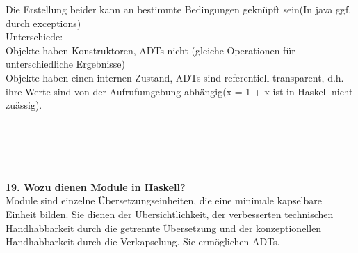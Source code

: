 \documentclass{article}
\begin{document}
Die Erstellung beider kann an bestimmte Bedingungen gekn\"upft sein(In java ggf. durch exceptions)
\\
Unterschiede:\\
Objekte haben Konstruktoren, ADTs nicht (gleiche Operationen für unterschiedliche Ergebnisse)\\
Objekte haben einen internen Zustand, ADTs sind 
referentiell transparent, d.h. ihre Werte sind von der Aufrufumgebung abhängig(x = 1 + x ist in Haskell nicht zu\"assig).\\
\\
\\
\\
\\
\\
\textbf{19. Wozu dienen Module in Haskell?}
\\
Module sind einzelne Übersetzungseinheiten, die eine minimale kapselbare Einheit bilden. Sie dienen der Übersichtlichkeit, der verbesserten technischen Handhabbarkeit durch die getrennte Übersetzung und der konzeptionellen Handhabbarkeit durch die Verkapselung. Sie erm\"oglichen ADTs.
\end{document}

